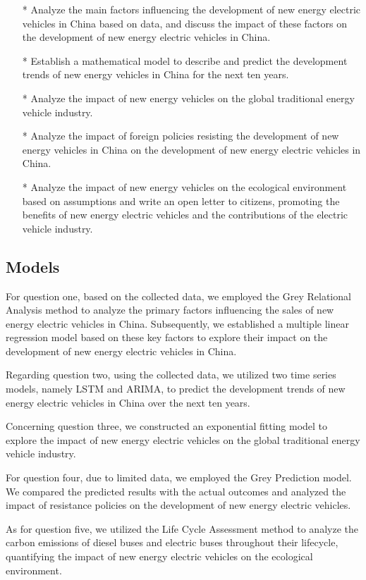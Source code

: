 \documentclass{apmcmthesis}
\begin{document}
\begin{itemize}
    \item[*] Analyze the main factors influencing the development of new energy electric vehicles in China based on data, and discuss the impact of these factors on the development of new energy electric vehicles in China.
    \item[*] Establish a mathematical model to describe and predict the development trends of new energy vehicles in China for the next ten years.
    \item[*]  Analyze the impact of new energy vehicles on the global traditional energy vehicle industry.
    \item[*] Analyze the impact of foreign policies resisting the development of new energy vehicles in China on the development of new energy electric vehicles in China.
    \item[*] Analyze the impact of new energy vehicles on the ecological environment based on assumptions and write an open letter to citizens, promoting the benefits of new energy electric vehicles and the contributions of the electric vehicle industry.
    \end{itemize}

\subsection{Models}
For question one, based on the collected data, we employed the Grey Relational Analysis method to analyze the primary factors influencing the sales of new energy electric vehicles in China. Subsequently, we established a multiple linear regression model based on these key factors to explore their impact on the development of new energy electric vehicles in China.

Regarding question two, using the collected data, we utilized two time series models, namely LSTM and ARIMA, to predict the development trends of new energy electric vehicles in China over the next ten years.

Concerning question three, we constructed an exponential fitting model to explore the impact of new energy electric vehicles on the global traditional energy vehicle industry.

For question four, due to limited data, we employed the Grey Prediction model. We compared the predicted results with the actual outcomes and analyzed the impact of resistance policies on the development of new energy electric vehicles.

As for question five, we utilized the Life Cycle Assessment method to analyze the carbon emissions of diesel buses and electric buses throughout their lifecycle, quantifying the impact of new energy electric vehicles on the ecological environment.
\end{document}
